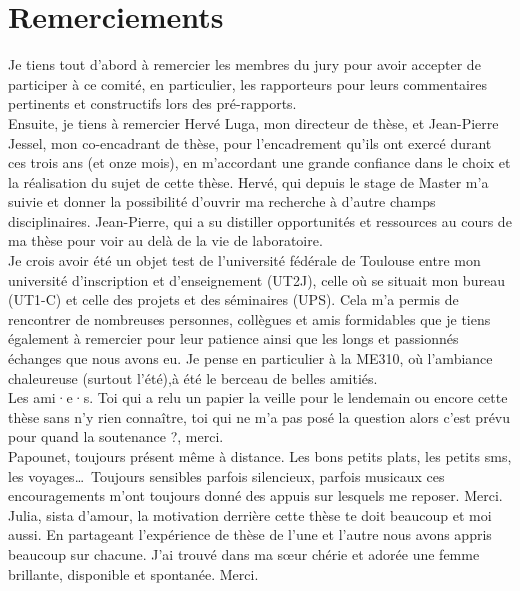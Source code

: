 
\thispagestyle{empty}
\section*{Remerciements}
\adjustmtc

Je tiens tout d'abord à remercier les membres du jury pour avoir accepter de 
participer à ce comité, en particulier, les rapporteurs pour leurs commentaires 
pertinents et constructifs lors des pré-rapports.
\\

Ensuite, je tiens à remercier Hervé Luga, mon directeur de thèse, et Jean-Pierre 
Jessel, mon co-encadrant de thèse, pour l'encadrement qu'ils ont exercé durant 
ces trois ans (et onze mois), en m'accordant une grande confiance dans le choix 
et la réalisation du sujet de cette thèse. 
Hervé, qui depuis le stage de Master m'a suivie et donner la possibilité d'ouvrir 
ma recherche à d'autre champs disciplinaires. Jean-Pierre, qui a su distiller 
opportunités et ressources au cours de ma thèse pour voir au delà de la vie de 
laboratoire.
\\

Je crois avoir été un objet test de l'université fédérale de Toulouse entre mon 
université d'inscription et d'enseignement (UT2J), celle où se situait mon bureau 
(UT1-C) et celle des projets et des séminaires (UPS). Cela m'a permis de 
rencontrer de nombreuses personnes, collègues et amis formidables que je tiens 
également à remercier pour leur patience ainsi que les longs et passionnés 
échanges que 
nous avons eu. Je pense en particulier à la ME310, où l'ambiance chaleureuse 
(surtout l'été),à 
été le berceau de belles amitiés.\\

Les ami·e·s. Toi qui a relu un papier la veille pour le lendemain ou encore cette 
thèse sans n'y rien connaître, toi qui ne m'a pas posé la question \og alors c'est 
prévu pour quand la soutenance ?\fg{}, merci. 
\\

Papounet, toujours présent même à distance. Les bons petits plats, les 
petits sms, les voyages\dots~Toujours sensibles parfois 
silencieux, parfois musicaux ces encouragements m'ont toujours donné des 
appuis sur lesquels me reposer. Merci.\\

Julia, sista 
d'amour, la motivation derrière cette thèse te doit beaucoup et moi aussi. En 
partageant l'expérience de thèse de l'une et l'autre nous avons appris beaucoup 
sur chacune. J'ai trouvé dans ma sœur chérie et adorée une femme brillante, 
disponible et spontanée. Merci.
\\

